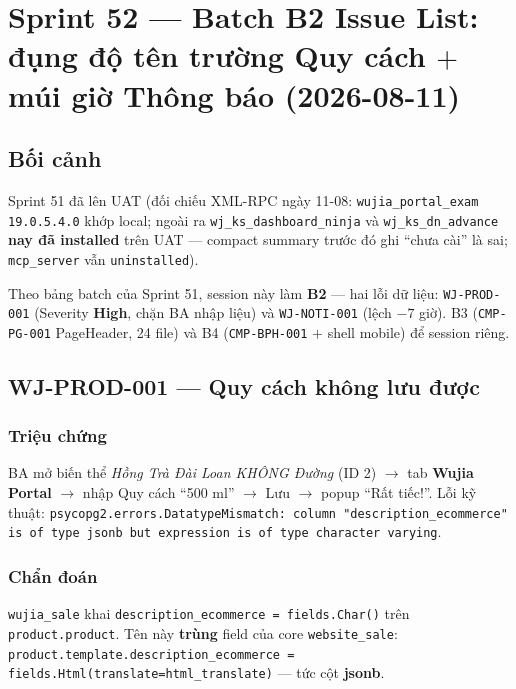 \chapter{Sprint 52 --- Batch B2 Issue List: đụng độ tên trường Quy cách $+$ múi giờ Thông báo (2026-08-11)}

\section{Bối cảnh}

Sprint 51 đã lên UAT (đối chiếu XML-RPC ngày 11-08: \texttt{wujia\_portal\_exam}
\texttt{19.0.5.4.0} khớp local; ngoài ra \texttt{wj\_ks\_dashboard\_ninja} và
\texttt{wj\_ks\_dn\_advance} \textbf{nay đã installed} trên UAT --- compact summary trước đó ghi
``chưa cài'' là sai; \texttt{mcp\_server} vẫn \texttt{uninstalled}).

Theo bảng batch của Sprint 51, session này làm \textbf{B2} --- hai lỗi dữ liệu:
\texttt{WJ-PROD-001} (Severity \textbf{High}, chặn BA nhập liệu) và \texttt{WJ-NOTI-001}
(lệch $-7$ giờ). B3 (\texttt{CMP-PG-001} PageHeader, 24 file) và B4 (\texttt{CMP-BPH-001} $+$
shell mobile) để session riêng.

\section{WJ-PROD-001 --- Quy cách không lưu được}

\subsection{Triệu chứng}

BA mở biến thể \emph{Hồng Trà Đài Loan KHÔNG Đường} (ID 2) $\rightarrow$ tab \textbf{Wujia
Portal} $\rightarrow$ nhập Quy cách ``500 ml'' $\rightarrow$ Lưu $\rightarrow$ popup ``Rất
tiếc!''. Lỗi kỹ thuật:
\texttt{psycopg2.errors.DatatypeMismatch: column "description\_ecommerce" is of type jsonb but
expression is of type character varying}.

\subsection{Chẩn đoán}

\texttt{wujia\_sale} khai \texttt{description\_ecommerce = fields.Char()} trên
\texttt{product.product}. Tên này \textbf{trùng} field của core \texttt{website\_sale}:
\texttt{product.template.description\_ecommerce = fields.Html(translate=html\_translate)} ---
tức cột \textbf{jsonb}.

